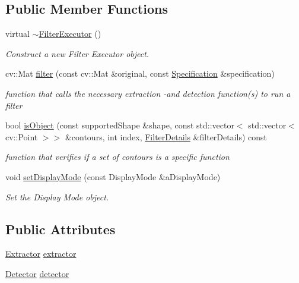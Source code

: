 \subsection*{Public Member Functions}
\begin{DoxyCompactItemize}
\item 
virtual \hyperlink{classFilterExecutor_a6dd36c64637e2747f1d997d4de5a121c}{$\sim$\+Filter\+Executor} ()
\begin{DoxyCompactList}\small\item\em Construct a new Filter Executor object. \end{DoxyCompactList}\item 
cv\+::\+Mat \hyperlink{classFilterExecutor_a06f4223dc3e15501aacc42b1f5bd026d}{filter} (const cv\+::\+Mat \&original, const \hyperlink{structSpecification}{Specification} \&specification)
\begin{DoxyCompactList}\small\item\em function that calls the necessary extraction -\/and detection function(s) to run a filter \end{DoxyCompactList}\item 
bool \hyperlink{classFilterExecutor_ab6054cdefd0e09ff04f2dd95489b1bea}{is\+Object} (const supported\+Shape \&shape, const std\+::vector$<$ std\+::vector$<$ cv\+::\+Point $>$$>$ \&contours, int index, \hyperlink{structFilterDetails}{Filter\+Details} \&filter\+Details) const 
\begin{DoxyCompactList}\small\item\em function that verifies if a set of contours is a specific function \end{DoxyCompactList}\item 
void \hyperlink{classFilterExecutor_a778b1fd0181990176842e5b107c0a76d}{set\+Display\+Mode} (const Display\+Mode \&a\+Display\+Mode)
\begin{DoxyCompactList}\small\item\em Set the Display Mode object. \end{DoxyCompactList}\end{DoxyCompactItemize}
\subsection*{Public Attributes}
\begin{DoxyCompactItemize}
\item 
\hyperlink{classExtractor}{Extractor} \hyperlink{classFilterExecutor_a4ab5f958ae995540afef4de2fc968d5d}{extractor}
\item 
\hyperlink{classDetector}{Detector} \hyperlink{classFilterExecutor_a5e2392a802b3aab62e95e5a7a7a066ae}{detector}
\end{DoxyCompactItemize}


